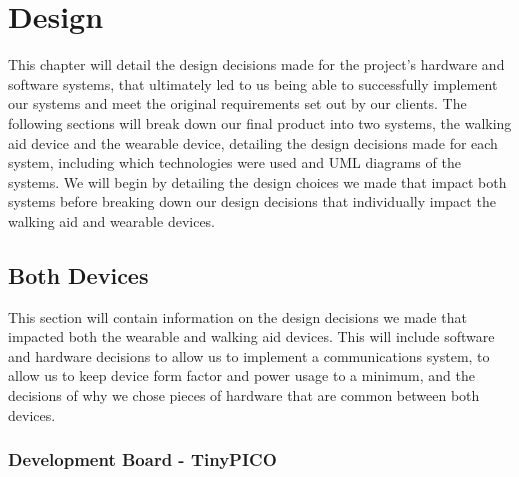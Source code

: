\chapter{Design}
\label{ch:design}

    This chapter will detail the design decisions made for the project's hardware and software systems, that ultimately led to us being able to successfully implement our systems and meet the original requirements set out by our clients. The following sections will break down our final product into two systems, the walking aid device and the wearable device, detailing the design decisions made for each system, including which technologies were used and UML diagrams of the systems. We will begin by detailing the design choices we made that impact both systems before breaking down our design decisions that individually impact the walking aid and wearable devices.

    \section{Both Devices}
    \label{sec:both_devices}

        This section will contain information on the design decisions we made that impacted both the wearable and walking aid devices. This will include software and hardware decisions to allow us to implement a communications system, to allow us to keep device form factor and power usage to a minimum, and the decisions of why we chose pieces of hardware that are common between both devices.

        \subsection{Development Board - TinyPICO}
        \label{subsec:development_board}

